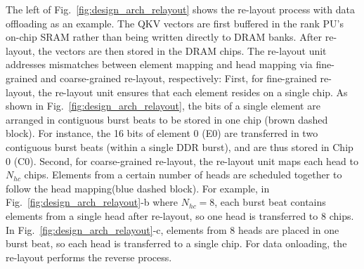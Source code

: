 The left of Fig.~\ref{fig:design_arch_relayout} shows the re-layout process with data offloading as an example. 
The QKV vectors are first buffered in the rank PU’s on-chip SRAM rather than being written directly to DRAM banks. 
After re-layout, the vectors are then stored in the DRAM chips. 
The re-layout unit addresses mismatches between element mapping and head mapping via fine-grained and coarse-grained re-layout, respectively:
First, for fine-grained re-layout, the re-layout unit ensures that each element resides on a single chip.
As shown in Fig.~\ref{fig:design_arch_relayout}, the bits of a single element are arranged in contiguous burst beats to be stored in one chip (brown dashed block).
For instance, the 16 bits of element 0 (E0) are transferred in two contiguous burst beats (within a single DDR burst), and are thus stored in Chip 0 (C0). 
Second, for coarse-grained re-layout, the re-layout unit maps each head to $N_{hc}$ chips.
Elements from a certain number of heads are scheduled together to follow the head mapping(blue dashed block).
For example, in Fig.~\ref{fig:design_arch_relayout}-b where $N_{hc}=8$, 
each burst beat contains elements from a single head after re-layout, 
so one head is transferred to 8 chips.
In Fig.~\ref{fig:design_arch_relayout}-c, elements from 8 heads are placed in one burst beat, so each head is transferred to a single chip. 
For data onloading, the re-layout performs the reverse process.



















